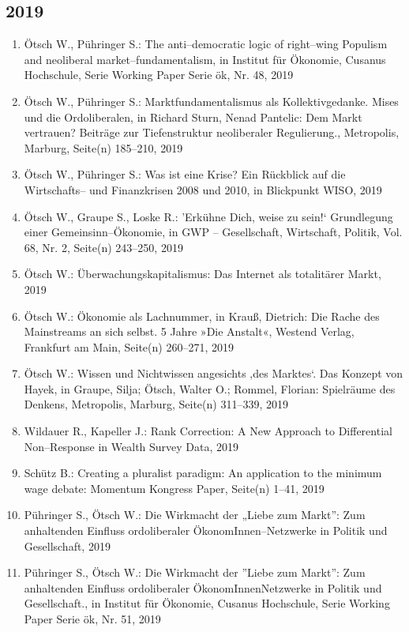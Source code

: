 \subsection*{2019}
\begin{enumerate}
    	 \item Ötsch W., Pühringer S.: The anti--democratic logic of right--wing Populism and neoliberal market--fundamentalism, in Institut für Ökonomie, Cusanus Hochschule, Serie Working Paper Serie ök, Nr. 48, 2019
	 \item Ötsch W., Pühringer S.: Marktfundamentalismus als Kollektivgedanke. Mises und die Ordoliberalen, in Richard Sturn, Nenad Pantelic: Dem Markt vertrauen? Beiträge zur Tiefenstruktur neoliberaler Regulierung., Metropolis, Marburg, Seite(n) 185--210, 2019
	 \item Ötsch W., Pühringer S.: Was ist eine Krise? Ein Rückblick auf die Wirtschafts-- und Finanzkrisen 2008 und 2010, in Blickpunkt WISO, 2019
	 \item Ötsch W., Graupe S., Loske R.: ’Erkühne Dich, weise zu sein!‘ Grundlegung einer Gemeinsinn--Ökonomie, in GWP -- Gesellschaft, Wirtschaft, Politik, Vol. 68, Nr. 2, Seite(n) 243--250, 2019
	 \item Ötsch W.: Überwachungskapitalismus: Das Internet als totalitärer Markt, 2019
	 \item Ötsch W.: Ökonomie als Lachnummer, in Krauß, Dietrich: Die Rache des Mainstreams an sich selbst. 5 Jahre »Die Anstalt«, Westend Verlag, Frankfurt am Main, Seite(n) 260--271, 2019
	 \item Ötsch W.: Wissen und Nichtwissen angesichts ‚des Marktes‘. Das Konzept von Hayek, in Graupe, Silja; Ötsch, Walter O.; Rommel, Florian: Spielräume des Denkens, Metropolis, Marburg, Seite(n) 311--339, 2019
	 \item Wildauer R., Kapeller J.: Rank Correction: A New Approach to Differential Non--Response in Wealth Survey Data, 2019
	 \item Schütz B.: Creating a pluralist paradigm: An application to the minimum wage debate: Momentum Kongress Paper, Seite(n) 1--41, 2019
	 \item Pühringer S., Ötsch W.: Die Wirkmacht der „Liebe zum Markt”: Zum anhaltenden Einfluss ordoliberaler ÖkonomInnen--Netzwerke in Politik und Gesellschaft, 2019
	 \item Pühringer S., Ötsch W.: Die Wirkmacht der ''Liebe zum Markt'': Zum anhaltenden Einfluss ordoliberaler ÖkonomInnenNetzwerke in Politik und Gesellschaft., in Institut für Ökonomie, Cusanus Hochschule, Serie Working Paper Serie ök, Nr. 51, 2019

\end{enumerate}
